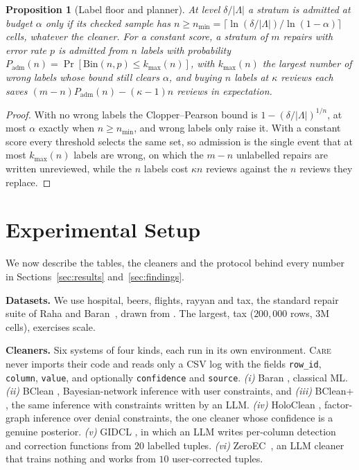 \documentclass[sigconf, nonacm, balance=false]{acmart}
\newtheorem{proposition}{Proposition}
\theoremstyle{remark}
\begin{document}
\begin{proposition}[Label floor and planner]
\label{thm:floor}
At level $\delta/|\Lambda|$ a stratum is admitted at budget $\alpha$ only if its checked
sample has $n\ge n_{\min}=\lceil\ln(\delta/|\Lambda|)/\ln(1-\alpha)\rceil$ cells,
whatever the cleaner. For a constant score, a stratum of $m$ repairs with error rate
$p$ is admitted from $n$ labels with probability
$P_{\mathrm{adm}}(n)=\Pr[\mathrm{Bin}(n,p)\le k_{\max}(n)]$, with $k_{\max}(n)$ the
largest number of wrong labels whose bound still clears $\alpha$, and buying $n$ labels
at $\kappa$ reviews each saves $(m-n)P_{\mathrm{adm}}(n)-(\kappa-1)n$ reviews in
expectation.
\end{proposition}
\begin{proof}
With no wrong labels the Clopper--Pearson bound is $1-(\delta/|\Lambda|)^{1/n}$, at
most $\alpha$ exactly when $n\ge n_{\min}$, and wrong labels only raise it. With a
constant score every threshold selects the same set, so admission is the single event
that at most $k_{\max}(n)$ labels are wrong, on which the $m-n$ unlabelled repairs are
written unreviewed, while the $n$ labels cost $\kappa n$ reviews against the $n$
reviews they replace.
\end{proof}

\section{Experimental Setup}
\label{sec:exp}

We now describe the tables, the cleaners and the protocol behind every number in
Sections~\ref{sec:results} and~\ref{sec:findings}.

\textbf{Datasets.} We use hospital, beers, flights, rayyan and tax, the standard repair
suite of Raha and Baran~\cite{10.1145/3299869.3324956, 10.14778/3407790.3407801}, drawn
from \cite{10.1109/icde.2013.6544847, 10.14778/2535568.2448943, 10.1186/s13643-016-0384-4,
10.14778/2850578.2850579}. The largest, tax ($200{,}000$ rows, $3$M cells), exercises scale.

\textbf{Cleaners.} Six systems of four kinds, each run in its own environment.
\textsc{Care} never imports their code and reads only a CSV log with the fields
\texttt{row\_id}, \texttt{column}, \texttt{value}, and optionally \texttt{confidence}
and \texttt{source}. \emph{(i)} Baran \cite{10.14778/3407790.3407801}, classical ML.
\emph{(ii)} BClean \cite{10597910}, Bayesian-network inference with user constraints,
and \emph{(iii)} BClean+ \cite{11361168}, the same inference with constraints written
by an LLM. \emph{(iv)} HoloClean \cite{10.14778/3137628.3137631}, factor-graph inference
over denial constraints, the one cleaner whose confidence is a genuine posterior.
\emph{(v)} GIDCL \cite{10.1145/3698811}, in which an LLM writes per-column detection
and correction functions from $20$ labelled tuples. \emph{(vi)}
ZeroEC~\cite{10.1109/ICDE65448.2025.00221}, an LLM cleaner that trains nothing and
works from $10$ user-corrected tuples.
\end{document}
